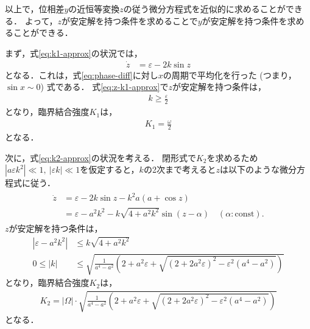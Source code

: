 \documentclass[../main]{subfiles}
\begin{document}
    以上で，位相差$y$の近恒等変換$z$の従う微分方程式を近似的に求めることができる．
    よって，$z$が安定解を持つ条件を求めることで$y$が安定解を持つ条件を求めることができる．
    
    まず，式\eqref{eq:k1-approx}の状況では，
    \begin{align}
        \dot{z}&=\varepsilon-2k\sin z
        \label{eq:z-k1-approx}
    \end{align}
    となる．これは，式\eqref{eq:phase-diff}に対し$x$の周期で平均化を行った (つまり，$\sin x\sim 0$) 式である．
    式\eqref{eq:z-k1-approx}で$z$が安定解を持つ条件は，
    \begin{align*}
        k\geq\frac{\varepsilon}{2}
    \end{align*}
    となり，臨界結合強度$K_1$は，
    \begin{align}
        \label{eq:K1-approx}
        K_1=\frac{\omega}{2}
    \end{align}
    となる．

    次に，式\eqref{eq:k2-approx}の状況を考える．
    閉形式で$K_2$を求めるため$|a\varepsilon k^2| \ll 1,\ |\varepsilon k|\ll 1$を仮定すると，$k$の2次まで考えると$z$は以下のような微分方程式に従う．
    \begin{align}
        \label{eq:z-k2-approx}
        \begin{split}
            \dot{z}&=\varepsilon-2k\sin z-k^2a(a+\cos  z)\\
            &=\varepsilon-a^2k^2-k\sqrt{4+a^2k^2}\sin ( z-\alpha)\quad(\alpha:\mathrm{const}).
        \end{split}
    \end{align}
    $z$が安定解を持つ条件は，
    \begin{align*}
        |\varepsilon-a^2k^2|&\leq k\sqrt{4+a^2k^2}\\
        0\leq |k|&\leq \sqrt{\frac{1}{a^4-a^2}\left(2+a^2\varepsilon+\sqrt{(2+2a^2\varepsilon)^2-\varepsilon^2(a^4-a^2)}\right)}
    \end{align*}
    となり，臨界結合強度$K_2$は，
    \begin{align}
        \label{eq:K2-approx}
        K_2=|\Omega|\cdot\sqrt{\frac{1}{a^4-a^2}\left(2+a^2\varepsilon+\sqrt{(2+2a^2\varepsilon)^2-\varepsilon^2(a^4-a^2)}\right)}
    \end{align}
    となる．    
    
\end{document}
